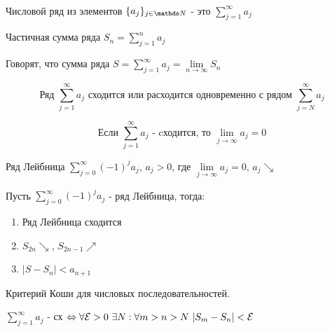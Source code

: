 \documentclass[matan]{subfiles}
\begin{document}
  \newpage
  \begin{Reminder} \
  \begin{definition}
      Числовой ряд из элементов $\{a_j\}_{j \in \N}$ - это $\sum\limits_{j=1}^\infty a_j$
  \end{definition}

  \begin{definition}
      Частичная сумма ряда $S_n = \sum\limits_{j=1}^n a_j$
  \end{definition}

  \begin{definition}
      Говорят, что сумма ряда $S=\sum\limits_{j=1}^\infty a_j=\lim\limits_{n \rightarrow \infty} S_n$
  \end{definition}

  \begin{Remark}
      \[\text{Ряд $\sum\limits_{j=1}^\infty a_j$ сходится или расходится одновременно с рядом $\sum\limits_{j=N}^\infty a_j$}\]
  \end{Remark}

  \begin{Theorem} 
      \[\text{Если $\sum\limits_{j=1}^\infty a_j$ - cходится, то $\lim\limits_{j \rightarrow \infty} a_j = 0$}\]
  \end{Theorem}

  \begin{definition}
      Ряд Лейбница $\sum\limits_{j=0}^\infty (-1)^j a_j$, $a_j>0$, где $\lim\limits_{j \rightarrow \infty} a_j =0$, $a_j \searrow$
  \end{definition}

  \begin{theorem}
      Пусть $\sum\limits_{j=0}^\infty (-1)^j a_j$ - ряд Лейбница, тогда:
      \begin{enumerate}
          \item Ряд Лейбница сходится
          \item $S_{2n} \searrow$, $S_{2n-1} \nearrow$
          \item $|S-S_n|<a_{n+1}$
      \end{enumerate}
  \end{theorem}

  \begin{theorem}
      Критерий Коши для числовых последовательностей.

      $\sum\limits_{j=1}^\infty a_j$ - сх $\Leftrightarrow \forall \mathcal{E} > 0\ \exists N: \forall m>n>N\ |S_m-S_n|<\mathcal{E}$
  \end{theorem}
  \end{Reminder}
\end{document}
